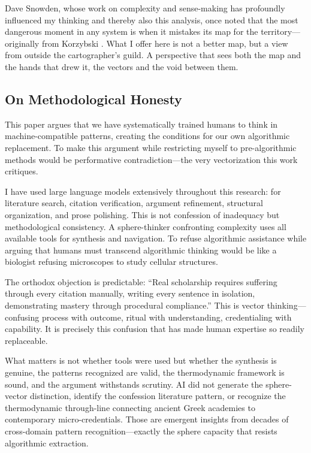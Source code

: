Dave Snowden, whose work on complexity and sense-making has profoundly influenced my thinking and thereby also this analysis, once noted that the most dangerous moment in any system is when it mistakes its map for the territory—originally from Korzybski \citep{korzybski1933}. What I offer here is not a better map, but a view from outside the cartographer's guild. A perspective that sees both the map and the hands that drew it, the vectors and the void between them.

\subsection*{On Methodological Honesty}

This paper argues that we have systematically trained humans to think in machine-compatible patterns, creating the conditions for our own algorithmic replacement. To make this argument while restricting myself to pre-algorithmic methods would be performative contradiction—the very vectorization this work critiques.

I have used large language models extensively throughout this research: for literature search, citation verification, argument refinement, structural organization, and prose polishing. This is not confession of inadequacy but methodological consistency. A sphere-thinker confronting complexity uses all available tools for synthesis and navigation. To refuse algorithmic assistance while arguing that humans must transcend algorithmic thinking would be like a biologist refusing microscopes to study cellular structures.

The orthodox objection is predictable: ``Real scholarship requires suffering through every citation manually, writing every sentence in isolation, demonstrating mastery through procedural compliance.'' This is vector thinking—confusing process with outcome, ritual with understanding, credentialing with capability. It is precisely this confusion that has made human expertise so readily replaceable.

What matters is not whether tools were used but whether the synthesis is genuine, the patterns recognized are valid, the thermodynamic framework is sound, and the argument withstands scrutiny. AI did not generate the sphere-vector distinction, identify the confession literature pattern, or recognize the thermodynamic through-line connecting ancient Greek academies to contemporary micro-credentials. Those are emergent insights from decades of cross-domain pattern recognition—exactly the sphere capacity that resists algorithmic extraction.

